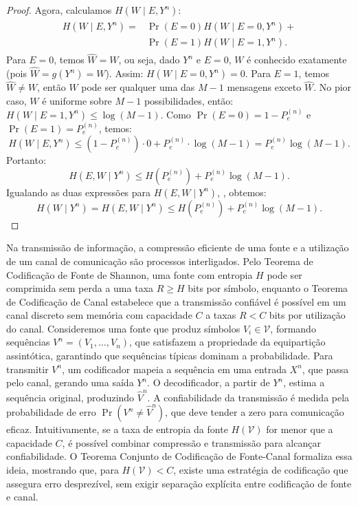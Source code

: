 \begin{proof}
Agora, calculamos $H(W \mid E, Y^n)$:
\begin{align}
  \begin{split}H(W \mid E, Y^n) ={}& \Pr(E = 0) H(W \mid E = 0, Y^n) + \\
                                   & \Pr(E = 1) H(W \mid E = 1, Y^n).\end{split}
\end{align}
Para $E = 0$, temos $\hat{W} = W$, ou seja, dado $Y^n$ e $E = 0$, $W$ é conhecido exatamente (pois $\hat{W} = g(Y^n) = W$). Assim:
$H(W \mid E = 0, Y^n) = 0$.
Para $E = 1$, temos $\hat{W} \neq W$, então $W$ pode ser qualquer uma das $M - 1$ mensagens exceto $\hat{W}$. No pior caso, $W$ é uniforme sobre $M - 1$ possibilidades, então:
$H(W \mid E = 1, Y^n) \leq \log (M - 1)$.
Como $\Pr(E = 0) = 1 - P_e^{(n)}$ e $\Pr(E = 1) = P_e^{(n)}$, temos:
\begin{equation}
H(W \mid E, Y^n) \leq (1 - P_e^{(n)}) \cdot 0 + P_e^{(n)} \cdot \log (M - 1) = P_e^{(n)} \log (M - 1).
\end{equation}
Portanto:
\begin{equation}\label{eq:fanoHEWmidYn2}
H(E, W \mid Y^n) \leq H(P_e^{(n)}) + P_e^{(n)} \log (M - 1).
\end{equation}
Igualando as duas expressões para $H(E, W \mid Y^n)$, , obtemos:
\begin{equation}
H(W \mid Y^n) = H(E, W \mid Y^n) \leq H(P_e^{(n)}) + P_e^{(n)} \log (M - 1).
\end{equation}
\end{proof}




Na transmissão de informação, a compressão eficiente de uma fonte e a
utilização de um canal de comunicação são processos interligados. Pelo Teorema
de Codificação de Fonte de Shannon, uma fonte com entropia $H$ pode ser
comprimida sem perda a uma taxa $R \geq H$ bits por símbolo, enquanto o Teorema
de Codificação de Canal estabelece que a transmissão confiável é possível em um
canal discreto sem memória com capacidade $C$ a taxas $R < C$ bits por
utilização do canal. Consideremos uma fonte que produz símbolos $V_i \in
\mathcal{V}$, formando sequências $V^n = (V_1, \ldots, V_n)$, que satisfazem a
propriedade da equipartição assintótica, garantindo que sequências típicas
dominam a probabilidade. Para transmitir $V^n$, um codificador mapeia a
sequência em uma entrada $X^n$, que passa pelo canal, gerando uma saída $Y^n$.
O decodificador, a partir de $Y^n$, estima a sequência original, produzindo
$\hat{V}^n$. A confiabilidade da transmissão é medida pela probabilidade de
erro $\Pr(V^n \neq \hat{V}^n)$, que deve tender a zero para comunicação eficaz.
Intuitivamente, se a taxa de entropia da fonte $H(\mathcal{V})$ for menor que a
capacidade $C$, é possível combinar compressão e transmissão para alcançar
confiabilidade. O Teorema Conjunto de Codificação de Fonte-Canal
formaliza essa ideia, mostrando que, para $H(\mathcal{V}) < C$, existe uma
estratégia de codificação que assegura erro desprezível, sem exigir separação
explícita entre codificação de fonte e canal.

